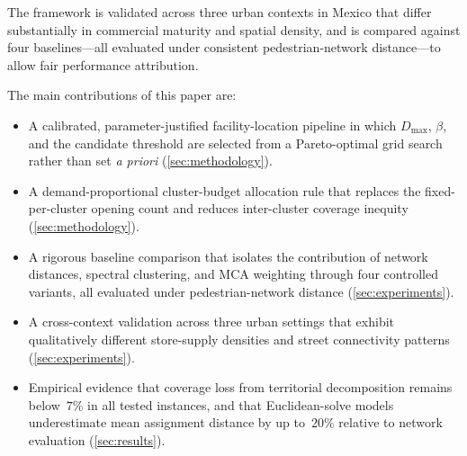 The framework is validated across three urban contexts in Mexico that differ
substantially in commercial maturity and spatial density, and is compared
against four baselines—all evaluated under consistent pedestrian-network
distance—to allow fair performance attribution.

The main contributions of this paper are:
\begin{itemize}
  \item A calibrated, parameter-justified facility-location pipeline in which
        $D_{\max}$, $\beta$, and the candidate threshold are selected from
        a Pareto-optimal grid search rather than set \textit{a priori}
        (\cref{sec:methodology}).
  \item A demand-proportional cluster-budget allocation rule that replaces
        the fixed-per-cluster opening count and reduces inter-cluster
        coverage inequity (\cref{sec:methodology}).
  \item A rigorous baseline comparison that isolates the contribution of
        network distances, spectral clustering, and MCA weighting through
        four controlled variants, all evaluated under pedestrian-network
        distance (\cref{sec:experiments}).
  \item A cross-context validation across three urban settings that exhibit
        qualitatively different store-supply densities and street
        connectivity patterns (\cref{sec:experiments}).
  \item Empirical evidence that coverage loss from territorial decomposition
        remains below~$7$\% in all tested instances, and that Euclidean-solve
        models underestimate mean assignment distance by up to~$20$\%
        relative to network evaluation (\cref{sec:results}).
\end{itemize}

